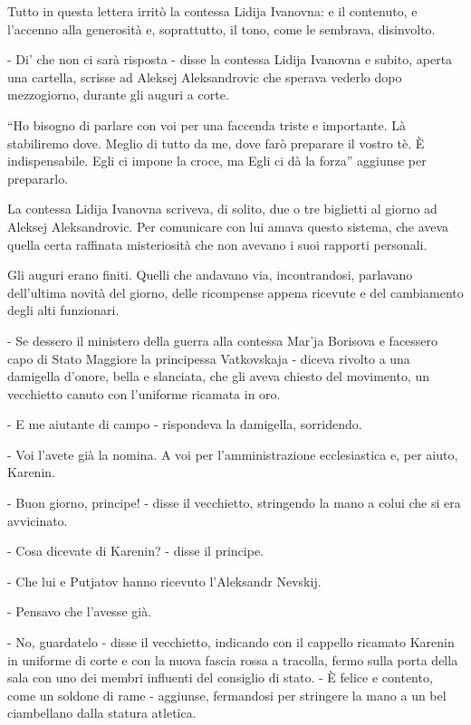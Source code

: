 Tutto in questa lettera irritò la contessa Lidija Ivanovna: e il contenuto, e l'accenno alla generosità e, soprattutto, il tono, come le sembrava, disinvolto. 

- Di' che non ci sarà risposta - disse la contessa Lidija Ivanovna e subito, aperta una cartella, scrisse ad Aleksej Aleksandrovic che sperava vederlo dopo mezzogiorno, durante gli auguri a corte. 

``Ho bisogno di parlare con voi per una faccenda triste e importante. Là stabiliremo dove. Meglio di tutto da me, dove farò preparare il vostro tè. È indispensabile. Egli ci impone la croce, ma Egli ci dà la forza'' aggiunse per prepararlo. 

La contessa Lidija Ivanovna scriveva, di solito, due o tre biglietti al giorno ad Aleksej Aleksandrovic. Per comunicare con lui amava questo sistema, che aveva quella certa raffinata misteriosità che non avevano i suoi rapporti personali. 

Gli auguri erano finiti. Quelli che andavano via, incontrandosi, parlavano dell'ultima novità del giorno, delle ricompense appena ricevute e del cambiamento degli alti funzionari. 

- Se dessero il ministero della guerra alla contessa Mar'ja Borisova e facessero capo di Stato Maggiore la principessa Vatkovskaja - diceva rivolto a una damigella d'onore, bella e slanciata, che gli aveva chiesto del movimento, un vecchietto canuto con l'uniforme ricamata in oro. 

- E me aiutante di campo - rispondeva la damigella, sorridendo. 

- Voi l'avete già la nomina. A voi per l'amministrazione ecclesiastica e, per aiuto, Karenin. 

- Buon giorno, principe! - disse il vecchietto, stringendo la mano a colui che si era avvicinato. 

- Cosa dicevate di Karenin? - disse il principe. 

- Che lui e Putjatov hanno ricevuto l'Aleksandr Nevskij. 

- Pensavo che l'avesse già. 

- No, guardatelo - disse il vecchietto, indicando con il cappello ricamato Karenin in uniforme di corte e con la nuova fascia rossa a tracolla, fermo sulla porta della sala con uno dei membri influenti del consiglio di stato. - È felice e contento, come un soldone di rame - aggiunse, fermandosi per stringere la mano a un bel ciambellano dalla statura atletica. 

